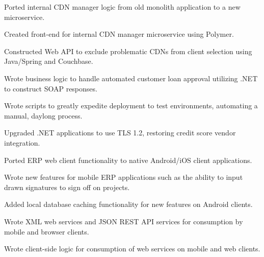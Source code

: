 \documentclass[line]{resume}
\begin{document}
\vspace{2px}

\begin{myitemize}
	\item Ported internal CDN manager logic from old monolith application to a new microservice.
	\item Created front-end for internal CDN manager microservice using Polymer.
	\item Constructed Web API to exclude problematic CDNs from client selection using Java/Spring and Couchbase.
\end{myitemize}

\vspace{2px}

\begin{myitemize}
	\item Wrote business logic to handle automated customer loan approval utilizing .NET to construct SOAP responses.
	\item Wrote scripts to greatly expedite deployment to test environments, automating a manual, daylong process.
	\item Upgraded .NET applications to use TLS 1.2, restoring credit score vendor integration.
\end{myitemize}

\vspace{2px}

\begin{myitemize}
	\item Ported ERP web client functionality to native Android/iOS client applications.
	\item Wrote new features for mobile ERP applications such as the ability to input drawn signatures to sign off on projects.
	\item Added local database caching functionality for new features on Android clients.
	\item Wrote XML web services and JSON REST API services for consumption by mobile and browser clients.
	\item Wrote client-side logic for consumption of web services on mobile and web clients.
\end{myitemize}
\end{document}
